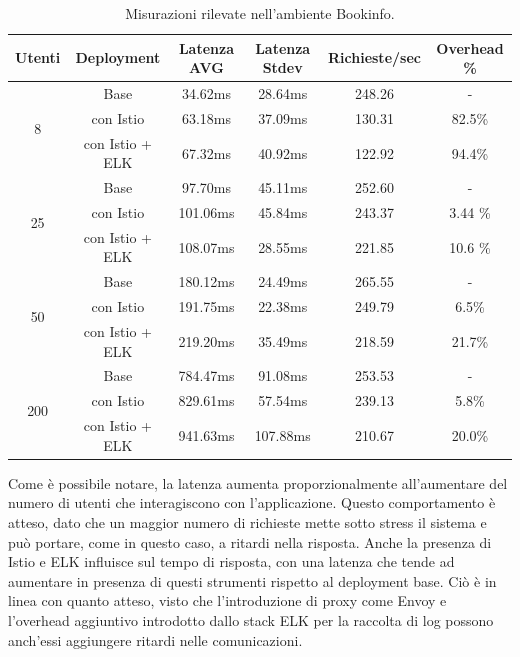 \begin{table}[h]
\centering
\begin{tabular}{|c|c|c|c|c|c|}
\hline
\rowcolor{lightgray}
\textbf{Utenti} & \textbf{Deployment} & \textbf{Latenza AVG} & \textbf{Latenza Stdev} & \textbf{Richieste/sec} & \textbf{Overhead \%} \\
\hline
\multirow{3}{*}{8} & Base & 34.62ms & 28.64ms & 248.26 & - \\
& con Istio & 63.18ms & 37.09ms & 130.31 & 82.5\% \\
& con Istio + ELK & 67.32ms & 40.92ms & 122.92 & 94.4\% \\
\hline
\multirow{3}{*}{25} & Base & 97.70ms & 45.11ms & 252.60 & - \\
& con Istio & 101.06ms & 45.84ms & 243.37 & 3.44 \% \\
& con Istio + ELK & 108.07ms & 28.55ms & 221.85 & 10.6 \% \\
\hline
\multirow{3}{*}{50} & Base & 180.12ms & 24.49ms & 265.55 & - \\
& con Istio & 191.75ms & 22.38ms & 249.79 & 6.5\% \\
& con Istio + ELK & 219.20ms & 35.49ms & 218.59 & 21.7\% \\
\hline
\multirow{3}{*}{200} & Base & 784.47ms & 91.08ms & 253.53 & - \\
& con Istio & 829.61ms & 57.54ms & 239.13 & 5.8\% \\
& con Istio + ELK & 941.63ms & 107.88ms & 210.67 & 20.0\% \\
\hline
\end{tabular}
\caption{Misurazioni rilevate nell'ambiente Bookinfo.}
\label{table:tabella_latenze}
\end{table}




Come è possibile notare, la latenza aumenta proporzionalmente all'aumentare del numero di utenti che interagiscono con l'applicazione. Questo comportamento è atteso, dato che un maggior numero di richieste mette sotto stress il sistema e può portare, come in questo caso, a ritardi nella risposta. Anche la presenza di Istio e ELK influisce sul tempo di risposta, con una latenza che tende ad aumentare in presenza di questi strumenti rispetto al deployment base. Ciò è in linea con quanto atteso, visto che l'introduzione di proxy come Envoy e l'overhead aggiuntivo introdotto dallo stack ELK per la raccolta di log possono anch'essi aggiungere ritardi nelle comunicazioni.

